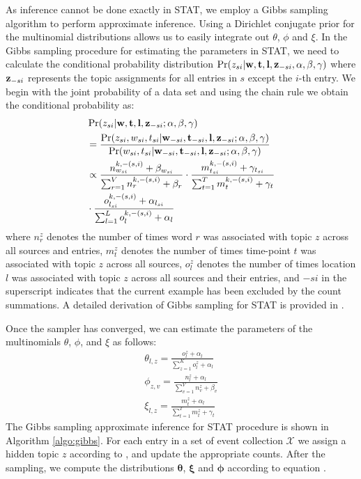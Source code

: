 \documentclass[conference]{IEEEtran}
\newcommand{\model}{{STAT}\xspace} %
\newcommand{\w}{{\bf w}}
\newcommand{\z}{{\bf z}}
\newcommand{\loc}{{\bf l}}
\newcommand{\tim}{{\bf t}}
\begin{document}
As inference cannot be done exactly in \model, we employ a Gibbs sampling algorithm to perform approximate inference. Using a Dirichlet conjugate prior for the multinomial distributions allows us to easily integrate out $\theta$, $\phi$ and $\xi$.  In the Gibbs sampling procedure for estimating the parameters in \model, we need to calculate the conditional probability distribution $\Pr(z_{si}|{\bf w},{\bf t}, {\bf l}, {\bf z}_{-si}, \alpha, \beta, \gamma)$ where ${\bf z}_{-si}$ represents the topic assignments for all entries in $s$ except the $i$-th entry. We begin with the joint probability of a data set and using the chain rule we obtain the conditional probability as:
\begin{align}
\label{eq:conditional}
&\Pr(z_{si}| \w,\tim,\loc,\z_{-si};\alpha,\beta,\gamma) \nonumber \\
&= \frac{\Pr(z_{si}, w_{si}, t_{si}|\w_{-si},\tim_{-si},\loc,\z_{-si};\alpha,\beta,\gamma)}{\Pr(w_{si}, t_{si}|\w_{-si},\tim_{-si},\loc,\z_{-si};\alpha,\beta,\gamma)} \nonumber \\
& \propto \frac{n^{k,-(s,i)}_{w_{si}} + \beta_{w_{si}}}{\sum_{r = 1}^V n^{k,-(s,i)}_{r} + \beta_{r}} \cdot \frac{m^{k,-(s,i)}_{t_{si}} + \gamma_{t_{si}}}{\sum_{t = 1}^T m^{k,-(s,i)}_{t} + \gamma_{t}} \nonumber \\
& \cdot \frac{o^{k,-(s,i)}_{l_{si}} + \alpha_{l_{si}}}{\sum_{l = 1}^L o^{k,-(s,i)}_{l} + \alpha_{l}}
\end{align}
where $n^{z}_{r}$ denotes the number of times word $r$ was associated with topic $z$ across all sources and entries, $m^{z}_{t}$ denotes the number of times time-point $t$ was associated with topic $z$ across all sources, $o^z_l$ denotes the number of times location $l$ was associated with topic $z$ across all sources and their entries, and $-si$ in the superscript indicates that the current example has been excluded by the count summations. A detailed derivation of Gibbs sampling for \model is provided in . 

Once the sampler has converged, we can estimate the parameters of the multinomials $\theta$, $\phi$, and $\xi$ as follows:
\begin{align}
\label{eq:updates}
\theta_{l,z} = \frac{o^z_l + \alpha_l}{\sum_{z=1}^K o^z_l + \alpha_l} \nonumber \\
\phi_{z,v} = \frac{n^z_l + \alpha_l}{\sum_{v=1}^V n^z_v + \beta_v}  \\
\xi_{l,z} = \frac{m^z_t + \alpha_l}{\sum_{t=1}^T m^z_t + \gamma_t} \nonumber
\end{align}
The Gibbs sampling approximate inference for \model procedure is shown in Algorithm \ref{algo:gibbs}. For each entry in a set of event collection $\mathcal{X}$ we assign a hidden topic $z$ according to , and update the appropriate counts. After the sampling, we compute the distributions ${\boldsymbol \theta}$, ${\boldsymbol \xi}$ and ${\boldsymbol \phi}$ according to equation . 
\end{document}

